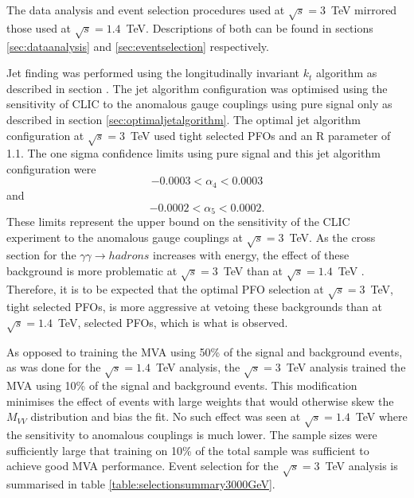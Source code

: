 The data analysis and event selection procedures used at $\sqrt{s}=3$~TeV mirrored those used at $\sqrt{s}=1.4$~TeV.  Descriptions of both can be found in sections \ref{sec:dataanalysis} and \ref{sec:eventselection} respectively.  

Jet finding was performed using the longitudinally invariant $k_{t}$ algorithm as described in section \label{sec:jetpairing}.  The jet algorithm configuration was optimised using the sensitivity of CLIC to the anomalous gauge couplings using pure signal only as described in section \ref{sec:optimaljetalgorithm}.  The optimal jet algorithm configuration at $\sqrt{s}=3$~TeV used tight selected PFOs and an R parameter of 1.1.  The one sigma confidence limits using pure signal and this jet algorithm configuration were 
%
\begin{equation}
-0.0003 < \alpha_{4} < 0.0003 
\end{equation}
\noindent and 
\begin{equation}
-0.0002 < \alpha_{5} < 0.0002 \text{.}
\end{equation}
%
\noindent These limits represent the upper bound on the sensitivity of the CLIC experiment to the anomalous gauge couplings at $\sqrt{s}=3$~TeV.  As the cross section for the $\gamma\gamma \rightarrow hadrons$ increases with energy, the effect of these background is more problematic at $\sqrt{s}=3$~TeV than at $\sqrt{s}=1.4$~TeV \cite{arXiv:1209.4039}.  Therefore, it is to be expected that the optimal PFO selection at $\sqrt{s}=3$~TeV, tight selected PFOs, is more aggressive at vetoing these backgrounds than at $\sqrt{s}=1.4$~TeV, selected PFOs, which is what is observed.  

As opposed to training the MVA using 50\% of the signal and background events, as was done for the $\sqrt{s}=1.4$~TeV analysis, the $\sqrt{s}=3$~TeV analysis trained the MVA using 10\% of the signal and background events.  This modification minimises the effect of events with large weights that would otherwise skew the $M_{VV}$ distribution and bias the fit.  No such effect was seen at $\sqrt{s}=1.4$~TeV where the sensitivity to anomalous couplings is much lower.  The sample sizes were sufficiently large that training on 10\% of the total sample was sufficient to achieve good MVA performance.  Event selection for the $\sqrt{s}=3$~TeV analysis is summarised in table \ref{table:selectionsummary3000GeV}.

